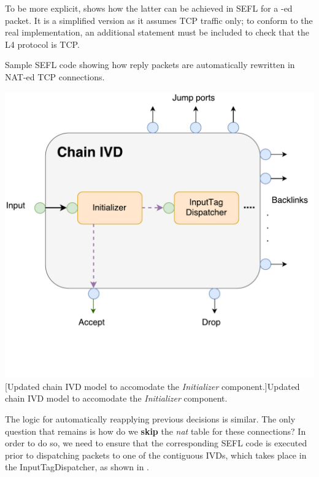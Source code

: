 To be more explicit,  shows how the
latter can be achieved in SEFL for a \SNAT-ed packet.  It is a simplified
version as it assumes TCP traffic only; to conform to the real implementation,
an additional  statement must be included to check that the L4
protocol is TCP.

\begin{minipage}{.6\textwidth}
\begin{listing}[H]
  \caption{Sample SEFL code showing how reply packets are automatically
  rewritten in NAT-ed TCP connections.}
  \label{lst:nat-reply-sefl}
\end{listing}
\end{minipage}\hfill
\begin{minipage}{.36\textwidth}
  \centering
  \includegraphics[scale=0.3]{assets/img/chain-internal-initializer}
  [Updated chain IVD model to accomodate the
  \emph{Initializer} component.]{Updated chain IVD model to accomodate the
  \emph{Initializer} component.}
  \label{fig:chain-internal-initializer}
\end{minipage}

\bigskip

The logic for automatically reapplying previous decisions is similar.  The only
question that remains is how do we \textbf{skip} the \emph{nat} table for these
connections?  In order to do so, we need to ensure that the corresponding SEFL
code is executed prior to dispatching packets to one of the contiguous IVDs,
which takes place in the InputTagDispatcher, as shown in
.

